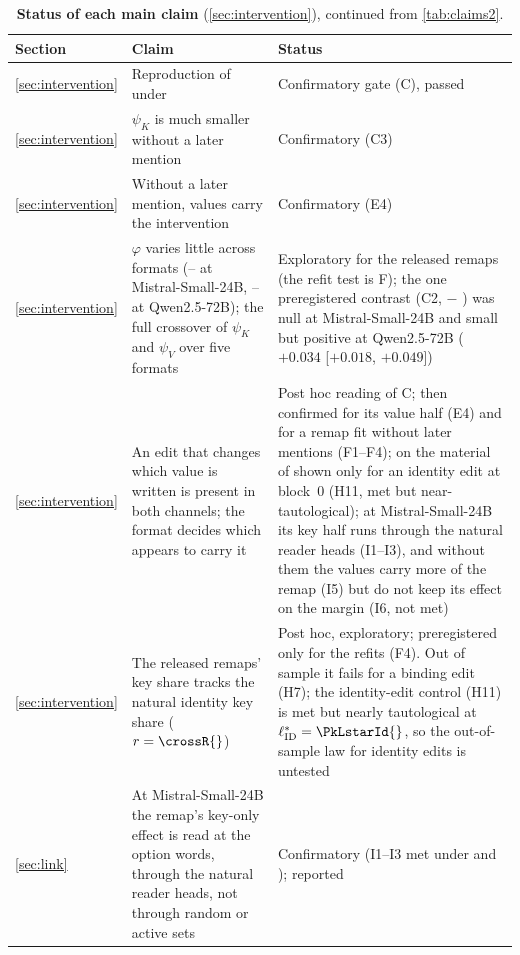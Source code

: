 \begin{table}[p]
\centering
\footnotesize
\caption{\textbf{Status of each main claim} (\cref{sec:intervention}), continued from \cref{tab:claims2}.}
\label{tab:claims3}
\begin{tabular}{p{}p{}p{}}
\toprule
Section & Claim & Status \\
\midrule
\cref{sec:intervention} & Reproduction of \citet{anonymous2026fitted} under \fmtOpt{} & Confirmatory gate (C), passed \\
\cref{sec:intervention} & $\psi_K$ is much smaller without a later mention & Confirmatory (C3) \\
\cref{sec:intervention} & Without a later mention, values carry the intervention & Confirmatory (E4) \\
\cref{sec:intervention} & $\varphi$ varies little across formats (\phiOptMistral{}--\phiLetterMistral{} at Mistral-Small-24B, \phiNoneQwen{}--\phiBeforeQwen{} at Qwen2.5-72B); the full crossover of $\psi_K$ and $\psi_V$ over five formats & Exploratory for the released remaps (the refit test is F); the one preregistered contrast (C2, \fmtOpt{} $-$ \fmtNone{}) was null at Mistral-Small-24B and small but positive at Qwen2.5-72B ($+0.034$ [$+0.018$, $+0.049$]) \\
\cref{sec:intervention} & An edit that changes which value is written is present in both channels; the format decides which appears to carry it & Post hoc reading of C; then confirmed for its value half (E4) and for a remap fit without later mentions (F1--F4); on the material of \citet{prakash2025lookbacks} shown only for an identity edit at block~0 (H11, met but near-tautological); at Mistral-Small-24B its key half runs through the natural reader heads (I1--I3), and without them the values carry more of the remap (I5) but do not keep its effect on the margin (I6, not met) \\
\cref{sec:intervention} & The released remaps' key share tracks the natural identity key share ($r = \crossR{}$) & Post hoc, exploratory; preregistered only for the refits (F4). Out of sample it fails for a binding edit (H7); the identity-edit control (H11) is met but nearly tautological at $\ell^*_{\mathrm{ID}} = \PkLstarId{}$, so the out-of-sample law for identity edits is untested \\
\cref{sec:link} & At Mistral-Small-24B the remap's key-only effect is read at the option words, through the natural reader heads, not through random or active sets & Confirmatory (I1--I3 met under \fmtOpt{} and \fmtLetter{}); \fmtPost{} reported \\

\end{tabular}
\end{table}
